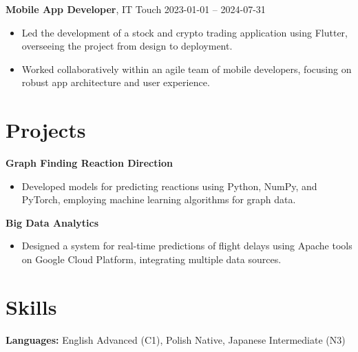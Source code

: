 \documentclass[10pt, letterpaper]{article}
\begin{document}
\begin{paracol}{2}
\noindent\textbf{Mobile App Developer}, IT Touch \switchcolumn
\hfill 2023-01-01 -- 2024-07-31
\end{paracol}

\vspace{5pt}

\begin{itemize}
    
    \item Led the development of a stock and crypto trading application using Flutter, overseeing the project from design to deployment.
    
    \item Worked collaboratively within an agile team of mobile developers, focusing on robust app architecture and user experience.
    
\end{itemize}


\section*{Projects}

\noindent\textbf{Graph Finding Reaction Direction}

\vspace{5pt}
\begin{itemize}
    
    \item Developed models for predicting reactions using Python, NumPy, and PyTorch, employing machine learning algorithms for graph data.
    
\end{itemize}

\noindent\textbf{Big Data Analytics}

\vspace{5pt}
\begin{itemize}
    
    \item Designed a system for real-time predictions of flight delays using Apache tools on Google Cloud Platform, integrating multiple data sources.
    
\end{itemize}


\section*{Skills}
\noindent\textbf{Languages:} 
English Advanced (C1), Polish Native, Japanese Intermediate (N3)
\vspace{5pt}
\end{document}
